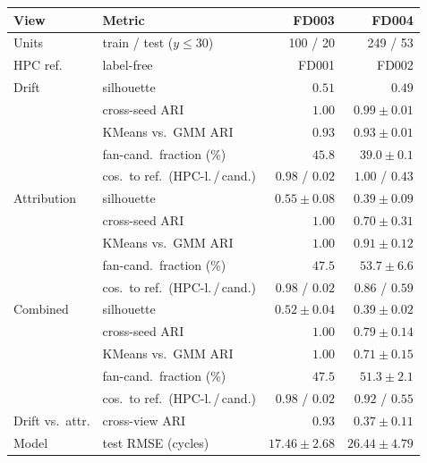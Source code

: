 \begin{tabular}{@{}llrr@{}}
\toprule
View & Metric & FD003 & FD004 \\
\midrule
Units & train / test ($y\le30$) & 100 / 20 & 249 / 53 \\
HPC ref. & label-free & FD001 & FD002 \\
\midrule
Drift & silhouette & $0.51$ & $0.49$ \\
 & cross-seed ARI & $1.00$ & $0.99\pm0.01$ \\
 & KMeans vs.\ GMM ARI & $0.93$ & $0.93\pm0.01$ \\
 & fan-cand.\ fraction (\%) & $45.8$ & $39.0\pm0.1$ \\
 & cos.\ to ref.\ (HPC-l.\,/\,cand.) & $0.98$ / $0.02$ & $1.00$ / $0.43$ \\
\midrule
Attribution & silhouette & $0.55\pm0.08$ & $0.39\pm0.09$ \\
 & cross-seed ARI & $1.00$ & $0.70\pm0.31$ \\
 & KMeans vs.\ GMM ARI & $1.00$ & $0.91\pm0.12$ \\
 & fan-cand.\ fraction (\%) & $47.5$ & $53.7\pm6.6$ \\
 & cos.\ to ref.\ (HPC-l.\,/\,cand.) & $0.98$ / $0.02$ & $0.86$ / $0.59$ \\
\midrule
Combined & silhouette & $0.52\pm0.04$ & $0.39\pm0.02$ \\
 & cross-seed ARI & $1.00$ & $0.79\pm0.14$ \\
 & KMeans vs.\ GMM ARI & $1.00$ & $0.71\pm0.15$ \\
 & fan-cand.\ fraction (\%) & $47.5$ & $51.3\pm2.1$ \\
 & cos.\ to ref.\ (HPC-l.\,/\,cand.) & $0.98$ / $0.02$ & $0.92$ / $0.55$ \\
\midrule
Drift vs.\ attr. & cross-view ARI & $0.93$ & $0.37\pm0.11$ \\
Model & test RMSE (cycles) & $17.46\pm2.68$ & $26.44\pm4.79$ \\
\bottomrule
\end{tabular}
